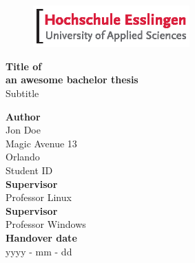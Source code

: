 
\begin{titlepage}
\thispagestyle{empty}

\begin{figure}[h]
\begin{flushright}
\includegraphics[trim= 15 12 10 15, clip, width=6cm]{HE-Logo.eps} 
\end{flushright}
\end{figure}
\vspace{0cm} 

\vspace{2cm}
\begin{center}
\Huge
\textbf{Title of } \\
\textbf{an awesome bachelor thesis}\\
\normalsize
\vspace{1cm}
Subtitle


\end{center}

\vspace{3cm}
\textbf{Author}\\
Jon Doe\\
Magic Avenue 13\\
Orlando\\
Student ID \\

\vspace{1cm}
\textbf{Supervisor}\\
Professor Linux \\

\vspace{1cm}
\textbf{Supervisor}\\
Professor Windows \\

\vspace{1cm}
\textbf{Handover date}\\
yyyy - mm - dd 

\end{titlepage}